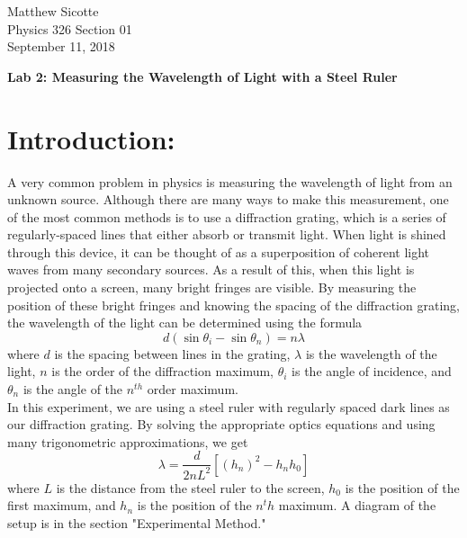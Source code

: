 \documentclass[leqno]{article}
\begin{document}
\begin{flushright}
Matthew Sicotte\\
Physics 326 Section 01\\
September 11, 2018
\end{flushright}
\begin{center}
	{\large \bf Lab 2: Measuring the Wavelength of Light with a Steel Ruler}
\end{center}
\section*{Introduction:}
A very common problem in physics is measuring the wavelength of light from an unknown source.  Although there are many ways to make this measurement, one of the most common methods is to use a diffraction grating, which is a series of regularly-spaced lines that either absorb or transmit light.  When light is shined through this device, it can be thought of as a superposition of coherent light waves from many secondary sources.  As a result of this, when this light is projected onto a screen, many bright fringes are visible.  By measuring the position of these bright fringes and knowing the spacing of the diffraction grating, the wavelength of the light can be determined using the formula
\begin{equation}
	d(\sin{\theta_i}-\sin{\theta_n})=n\lambda
\end{equation}
where $d$ is the spacing between lines in the grating, $\lambda$ is the wavelength of the light, $n$ is the order of the diffraction maximum, $\theta_i$ is the angle of incidence, and $\theta_n$ is the angle of the $n^{th}$ order maximum.\\

\noindent In this experiment, we are using a steel ruler with regularly spaced dark lines as our diffraction grating.  By solving the appropriate optics equations and using many trigonometric approximations, we get
\begin{equation}
	\lambda=\frac{d}{2nL^2}[(h_n)^2-h_n h_0]
\end{equation}
where $L$ is the distance from the steel ruler to the screen, $h_0$ is the position of the first maximum, and $h_n$ is the position of the $n^th$ maximum.
A diagram of the setup is in the section "Experimental Method."
\end{document}
